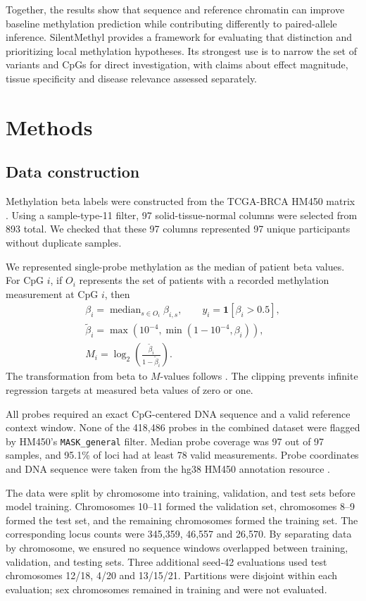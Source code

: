 \documentclass[11pt,letterpaper,twocolumn]{article}
\begin{document}
Together, the results show that sequence and reference chromatin can improve baseline methylation prediction while contributing differently to paired-allele inference. SilentMethyl provides a framework for evaluating that distinction and prioritizing local methylation hypotheses. Its strongest use is to narrow the set of variants and CpGs for direct investigation, with claims about effect magnitude, tissue specificity and disease relevance assessed separately.

\section{Methods}
\subsection{Data construction}
Methylation beta labels were constructed from the TCGA-BRCA HM450 matrix \cite{tcga2012breast,grossman2016gdc}. Using a sample-type-11 filter, 97 solid-tissue-normal columns were selected from 893 total. We checked that these 97 columns represented 97 unique participants without duplicate samples.

We represented single-probe methylation as the median of patient beta values. For CpG $i$, if $O_i$ represents the set of patients with a recorded methylation measurement at CpG $i$, then
\begin{gather*}
\beta_i=\operatorname{median}_{s\in O_i}\beta_{i,s},
\qquad y_i=\mathbf{1}[\beta_i>0.5],\\
\widetilde\beta_i=\max\left(10^{-4},\min\left(1-10^{-4},\beta_i\right)\right),\\
M_i=\log_2\left(\frac{\widetilde\beta_i}{1-\widetilde\beta_i}\right).
\end{gather*}
The transformation from beta to $M$-values follows \cite{du2010betamvalue}. The clipping prevents infinite regression targets at measured beta values of zero or one.

All probes required an exact CpG-centered DNA sequence and a valid reference context window. None of the 418,486 probes in the combined dataset were flagged by HM450's \texttt{MASK\_general} filter. Median probe coverage was 97 out of 97 samples, and 95.1\% of loci had at least 78 valid measurements. Probe coordinates and DNA sequence were taken from the hg38 HM450 annotation resource \cite{zhou2017infinium,chen2013crossreactive}.

The data were split by chromosome into training, validation, and test sets before model training. Chromosomes 10--11 formed the validation set, chromosomes 8--9 formed the test set, and the remaining chromosomes formed the training set. The corresponding locus counts were 345,359, 46,557 and 26,570. By separating data by chromosome, we ensured no sequence windows overlapped between training, validation, and testing sets. Three additional seed-42 evaluations used test chromosomes 12/18, 4/20 and 13/15/21. Partitions were disjoint within each evaluation; sex chromosomes remained in training and were not evaluated.
\end{document}
